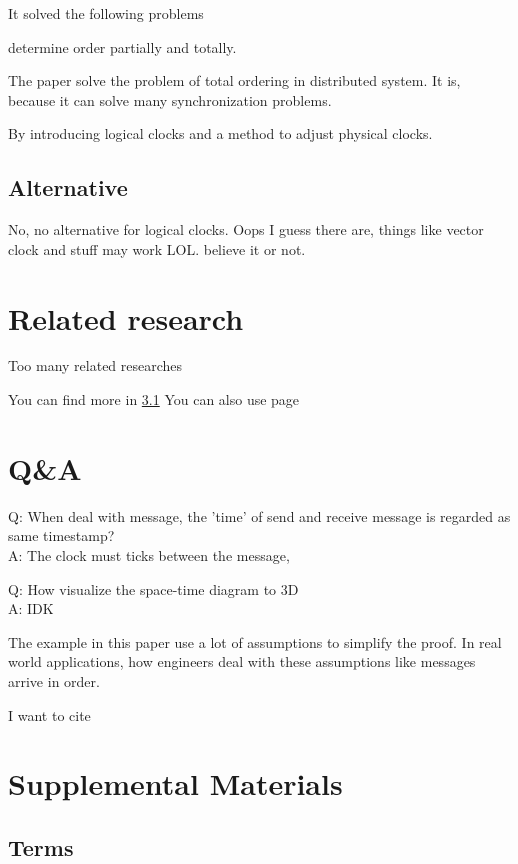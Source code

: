 \documentclass[12pt,a4paper,oneside]{article}
\begin{document}
It solved the following problems

determine order partially and totally. %

The paper solve the problem of total ordering in distributed system.
It is, because it can solve many synchronization problems.

By introducing logical clocks and a method to adjust physical clocks.

\subsection{Alternative}

No, no alternative for logical clocks. Oops I guess there are, things
like vector clock and stuff may work LOL. believe it or not.

\section{Related research}


Too many related researches

You can find more in \ref{l1}
You can also use page \pageref{l1}

\section{Q\&A}

Q: When deal with message, the 'time' of send and receive message is regarded as same timestamp? \\
A: The clock must ticks between the message,  %


Q: How visualize the space-time diagram to 3D \\
A: IDK

The example in this paper use a lot of assumptions to simplify the proof.
In real world applications, how engineers deal with these assumptions like messages
arrive in order.

I want to cite\cite{l}

\section{Supplemental Materials}

\subsection{Terms} \label{l1}
\end{document}
